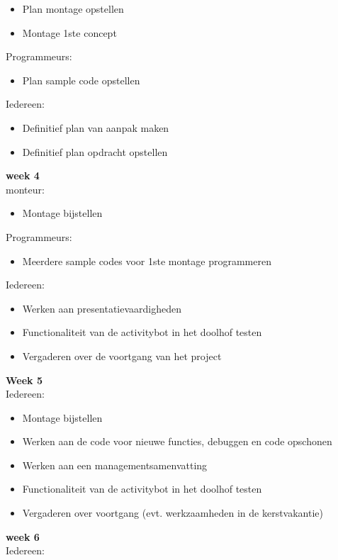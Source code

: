 \documentclass[oneside]{book}
\begin{document}
\begin{itemize}
\item Plan montage opstellen
\item Montage 1ste concept
\end{itemize}
Programmeurs:\\
\begin{itemize}
\item Plan sample code opstellen
\end{itemize}
Iedereen:\\
\begin{itemize}
\item Definitief plan van aanpak maken
\item Definitief plan opdracht opstellen
\end{itemize}
{\large \textbf{week 4}}\\
monteur:\\
\begin{itemize}
\item Montage bijstellen
\end{itemize}
Programmeurs:\\
\begin{itemize}
\item Meerdere sample codes voor 1ste montage programmeren
\end{itemize}
Iedereen:\\
\begin{itemize}
\item Werken aan presentatievaardigheden
\item Functionaliteit van de activitybot in het doolhof testen
\item Vergaderen over de voortgang van het project
\end{itemize}
{\large \textbf{Week 5}}\\
Iedereen:\\
\begin{itemize}
\item Montage bijstellen
\item Werken aan de code voor nieuwe functies, debuggen en code opschonen
\item Werken aan een managementsamenvatting
\item Functionaliteit van de activitybot in het doolhof testen
\item Vergaderen over voortgang (evt. werkzaamheden in de kerstvakantie)
\end{itemize}
{\large \textbf{week 6}}\\
Iedereen:\\
\end{document}
